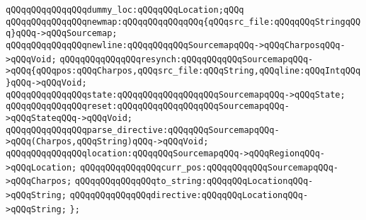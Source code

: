 \newline
\verb|qQQqqQQqqQQqqQQqdummy_loc:qQQqqQQqLocation;qQQq|\newline
\verb|qQQqqQQqqQQqqQQqnewmap:qQQqqQQqqQQqqQQq{qQQqsrc_file:qQQqqQQqStringqQQq}qQQq->qQQqSourcemap;|\newline
\verb|qQQqqQQqqQQqqQQqnewline:qQQqqQQqqQQqSourcemapqQQq->qQQqCharposqQQq->qQQqVoid;|\newline
\verb|qQQqqQQqqQQqqQQqresynch:qQQqqQQqqQQqSourcemapqQQq->qQQq{qQQqpos:qQQqCharpos,qQQqsrc_file:qQQqString,qQQqline:qQQqIntqQQq}qQQq->qQQqVoid;|\newline
\newline
\verb|qQQqqQQqqQQqqQQqstate:qQQqqQQqqQQqqQQqqQQqSourcemapqQQq->qQQqState;|\newline
\verb|qQQqqQQqqQQqqQQqreset:qQQqqQQqqQQqqQQqqQQqSourcemapqQQq->qQQqStateqQQq->qQQqVoid;|\newline
\newline
\verb|qQQqqQQqqQQqqQQqparse_directive:qQQqqQQqSourcemapqQQq->qQQq(Charpos,qQQqString)qQQq->qQQqVoid;|\newline
\verb|qQQqqQQqqQQqqQQqlocation:qQQqqQQqSourcemapqQQq->qQQqRegionqQQq->qQQqLocation;|\newline
\verb|qQQqqQQqqQQqqQQqcurr_pos:qQQqqQQqqQQqSourcemapqQQq->qQQqCharpos;|\newline
\verb|qQQqqQQqqQQqqQQqto_string:qQQqqQQqLocationqQQq->qQQqString;|\newline
\verb|qQQqqQQqqQQqqQQqdirective:qQQqqQQqLocationqQQq->qQQqString;|\newline
\newline
\verb|};|\newline
\newline

